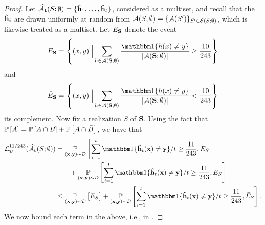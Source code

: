 \begin{proof}
Let $ \widehat{\mathcal{A}}_{\mathbf{t}}(S;\emptyset)=\{\mathbf{\hat{h}}_{1},\ldots,\mathbf{\hat{h}}_{t}  \}$, considered as a multiset, and recall that the $\mathbf{\hat{h}}_{i} $ are drawn uniformly at random from $ \mathcal{A}(S;\emptyset)=\{ \mathcal{A}(S') \}_{S'\in\mathcal{S}(S;\emptyset)} $, which is likewise treated as a multiset.
Let $ E_{\mathbf{S}} $ denote the event 
\[ E_{\rS}= \left \{(x,y) \; \Big| \sum_{h\in \erm(\rS;\emptyset)}\frac{\ind\{ h(x)\not=y \}}{|\erm(\rS;\emptyset)|} \geq \frac{10}{243}  \right \} \]
and 
\[ \bar{E}_{\rS}= \left \{(x,y) \; \Big| \sum_{h\in \erm(\rS;\emptyset)}\frac{\ind\{ h(x)\not=y \}}{|\erm(\rS;\emptyset)|} < \frac{10}{243}  \right \} \]
its complement. Now fix a realization $S$ of $ \mathbf{S} $. Using the fact that $ \operatorname*{\mathbb{P}}\left[A\right]=\operatorname*{\mathbb{P}}\left[A\cap B\right]+\operatorname*{\mathbb{P}}\left[A\cap \bar{B}\right]$, we have that 
\begin{align}\label{eq:uppsampledbound1}
\ls_{\cD}^{11/243}(\widehat{\erm}_{\rt}(S;\emptyset) )
    &= \p_{(\rx,\ry)\sim \cD}\left[\sum_{i=1}^{t} \ind\{   \rh_{t}(\rx)\not=\ry\}/t\geq \frac{11}{243}, E_{S}\right] \notag \\ 
    & \qquad +\p_{(\rx,\ry)\sim \cD}\left[\sum_{i=1}^{t} \ind\{   \rh_{t}(\rx)\not=\ry\}/t\geq\frac{11}{243}, \bar{E}_{S}\right] \notag
    \\
    &\leq \p_{(\rx,\ry)\sim\cD}\big [E_{S}\big]+\p_{(\rx,\ry)\sim \cD}\left[\sum_{i=1}^{t} \ind\{   \rh_{t}(\rx)\not=\ry\}/t\geq\frac{11}{243}, \bar{E}_{S}\right]. 
\end{align} 
We now bound each term in the above, i.e., in .


\end{proof}
